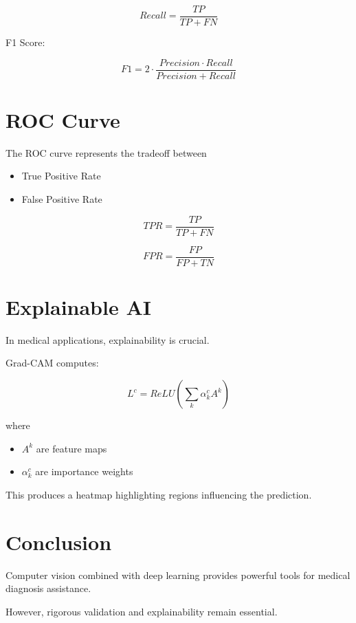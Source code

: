 ﻿\documentclass[11pt]{article}
\begin{document}
\[
Recall = \frac{TP}{TP + FN}
\]

F1 Score:

\[
F1 = 2 \cdot \frac{Precision \cdot Recall}{Precision + Recall}
\]

\section{ROC Curve}

The ROC curve represents the tradeoff between

\begin{itemize}
\item True Positive Rate
\item False Positive Rate
\end{itemize}

\[
TPR = \frac{TP}{TP + FN}
\]

\[
FPR = \frac{FP}{FP + TN}
\]

\section{Explainable AI}

In medical applications, explainability is crucial.

Grad-CAM computes:

\[
L^c = ReLU\left(\sum_k \alpha_k^c A^k\right)
\]

where

\begin{itemize}
\item $A^k$ are feature maps
\item $\alpha_k^c$ are importance weights
\end{itemize}

This produces a heatmap highlighting regions influencing the prediction.

\section{Conclusion}

Computer vision combined with deep learning provides powerful tools for medical diagnosis assistance.

However, rigorous validation and explainability remain essential.
\end{document}
